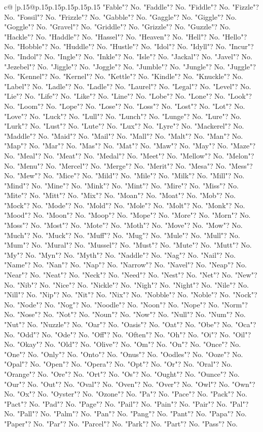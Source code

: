 \documentclass{article}
\begin{document}
{\begin{supertabular}{c@{$\;$}|p{.15\linewidth}@{}p{.15\linewidth}p{.15\linewidth}p{.15\linewidth}p{.15\linewidth}p{.15\linewidth}}
{{{"Fable"? No. "Faddle"? No. "Fiddle"? No. "Fizzle"? No. "Fossil"? No. "Frizzle"? No. "Gabble"? No. "Gaggle"? No. "Giggle"? No. "Goggle"? No. "Gravel"? No. "Griddle"? No. "Grizzle"? No. "Guzzle"? No. "Hackle"? No. "Haddle"? No. "Hassel"? No. "Heaven"? No. "Hell"? No. "Hello"? No. "Hobble"? No. "Huddle"? No. "Hustle"? No. "Idol"? No. "Idyll"? No. "Incur"? No. "Indol"? No. "Ingle"? No. "Inkle"? No. "Isle"? No. "Jackal"? No. "Javel"? No. "Jezebel"? No. "Jiggle"? No. "Joggle"? No. "Jumble"? No. "Jungle"? No. "Juggle"? No. "Kennel"? No. "Kernel"? No. "Kettle"? No. "Kindle"? No. "Knuckle"? No. "Label"? No. "Ladle"? No. "Ladle"? No. "Laurel"? No. "Legal"? No. "Level"? No. "Lie"? No. "Life"? No. "Like"? No. "Line"? No. "Lobe"? No. "Lone"? No. "Look"? No. "Loom"? No. "Lope"? No. "Lose"? No. "Loss"? No. "Lost"? No. "Lot"? No. "Love"? No. "Luck"? No. "Lull"? No. "Lunch"? No. "Lunge"? No. "Lure"? No. "Lurk"? No. "Lust"? No. "Lute"? No. "Lux"? No. "Lyre"? No. "Mackerel"? No. "Maddle"? No. "Maid"? No. "Mail"? No. "Mall"? No. "Malt"? No. "Man"? No. "Map"? No. "Mar"? No. "Mas"? No. "Mat"? No. "Maw"? No. "May"? No. "Maze"? No. "Meal"? No. "Meat"? No. "Medal"? No. "Meet"? No. "Mellow"? No. "Melon"? No. "Menu"? No. "Mercel"? No. "Merge"? No. "Merit"? No. "Mesa"? No. "Mess"? No. "Mew"? No. "Mice"? No. "Mild"? No. "Mile"? No. "Milk"? No. "Mill"? No. "Mind"? No. "Mine"? No. "Mink"? No. "Mint"? No. "Mire"? No. "Miss"? No. "Mite"? No. "Mitt"? No. "Mix"? No. "Moan"? No. "Moat"? No. "Mob"? No. "Mock"? No. "Mode"? No. "Mold"? No. "Mole"? No. "Molt"? No. "Monk"? No. "Mood"? No. "Moon"? No. "Moop"? No. "Mope"? No. "More"? No. "Morn"? No. "Moss"? No. "Most"? No. "Mote"? No. "Moth"? No. "Move"? No. "Mow"? No. "Much"? No. "Muck"? No. "Muff"? No. "Mug"? No. "Mule"? No. "Mull"? No. "Mum"? No. "Mural"? No. "Mussel"? No. "Must"? No. "Mute"? No. "Mutt"? No. "My"? No. "Myn"? No. "Myth"? No. "Naddle"? No. "Nag"? No. "Nail"? No. "Name"? No. "Nan"? No. "Nap"? No. "Narrow"? No. "Navel"? No. "Neap"? No. "Near"? No. "Neat"? No. "Neck"? No. "Need"? No. "Nest"? No. "Net"? No. "New"? No. "Nib"? No. "Nice"? No. "Nickle"? No. "Nigh"? No. "Night"? No. "Nile"? No. "Nill"? No. "Nip"? No. "Nit"? No. "Nix"? No. "Nobble"? No. "Noble"? No. "Nock"? No. "Node"? No. "Nog"? No. "Noodle"? No. "Noon"? No. "Nope"? No. "Norm"? No. "Nose"? No. "Not"? No. "Noun"? No. "Now"? No. "Null"? No. "Num"? No. "Nut"? No. "Nuzzle"? No. "Oar"? No. "Oasis"? No. "Oat"? No. "Obe"? No. "Oca"? No. "Odd"? No. "Ode"? No. "Off"? No. "Often"? No. "Oh"? No. "Oi"? No. "Oil"? No. "Okay"? No. "Old"? No. "Olive"? No. "Om"? No. "On"? No. "Once"? No. "One"? No. "Only"? No. "Onto"? No. "Onus"? No. "Oodles"? No. "Ooze"? No. "Opal"? No. "Open"? No. "Opera"? No. "Opt"? No. "Or"? No. "Oral"? No. "Orange"? No. "Ore"? No. "Ort"? No. "Os"? No. "Ought"? No. "Ounce"? No. "Our"? No. "Out"? No. "Oval"? No. "Oven"? No. "Over"? No. "Owl"? No. "Own"? No. "Ox"? No. "Oyster"? No. "Ozone"? No. "Pa"? No. "Pace"? No. "Pack"? No. "Pact"? No. "Pad"? No. "Page"? No. "Pail"? No. "Pain"? No. "Pair"? No. "Pal"? No. "Pall"? No. "Palm"? No. "Pan"? No. "Pang"? No. "Pant"? No. "Papa"? No. "Paper"? No. "Par"? No. "Parcel"? No. "Park"? No. "Part"? No. "Pass"? No. }}}
\end{supertabular}}
\end{document}
